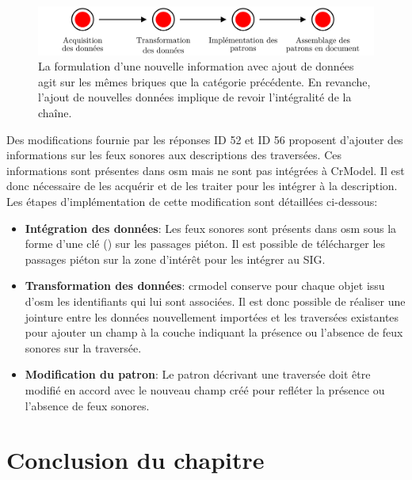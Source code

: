 \begin{figure}
    \centering
    \includegraphics[width=\textwidth]{images/evaluation/pipeline/pipeline_ajout_donnees.pdf}
    \caption[Formulation d'une nouvelle information avec ajout de donnée dans la chaîne de description]{La formulation d'une nouvelle information avec ajout de données agit sur les mêmes briques que la catégorie précédente. En revanche, l'ajout de nouvelles données implique de revoir l'intégralité de la chaîne.}
    \label{fig:evaluation_nouvelle_information_avec_ajout}
\end{figure}

\newpar{}

Des modifications fournie par les réponses ID 52 et ID 56 proposent d'ajouter des informations sur les feux sonores aux descriptions des traversées. Ces informations sont présentes dans \gls{osm} mais ne sont pas intégrées à CrModel. Il est donc nécessaire de les acquérir et de les traiter pour les intégrer à la description. Les étapes d'implémentation de cette modification sont détaillées ci-dessous:

\begin{itemize}
    \item \textbf{Intégration des données}: Les feux sonores sont présents dans \gls{osm} sous la forme d'une clé () sur les passages piéton. Il est possible de télécharger les passages piéton sur la zone d'intérêt pour les intégrer au SIG.
    \item \textbf{Transformation des données}: crmodel conserve pour chaque objet issu d'\gls{osm} les identifiants qui lui sont associées. Il est donc possible de réaliser une jointure entre les données nouvellement importées et les traversées existantes pour ajouter un champ à la couche indiquant la présence ou l'absence de feux sonores sur la traversée.
    \item \textbf{Modification du patron}: Le patron décrivant une traversée doit être modifié en accord avec le nouveau champ créé pour refléter la présence ou l'absence de feux sonores.
\end{itemize}

\section{Conclusion du chapitre}

